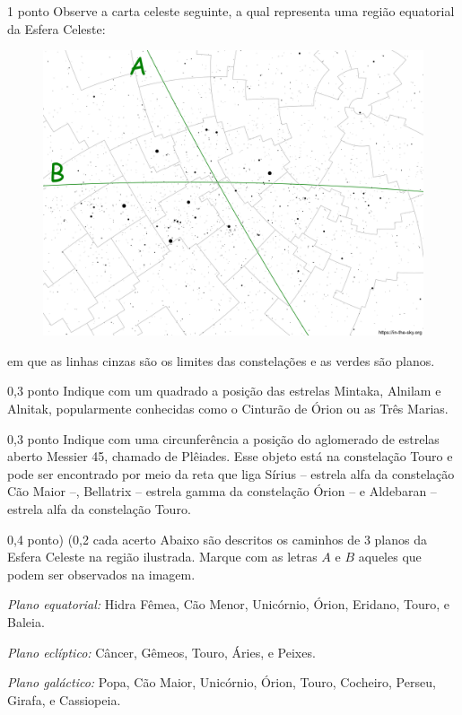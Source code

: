 \documentclass{../lista}
\begin{document}
	\begin{questao}{1 ponto}
		Observe a carta celeste seguinte, a qual representa uma região equatorial da Esfera Celeste:
		\begin{figure}[H]
			\centering
			\includegraphics[scale=0.5]{./img/4.png}
		\end{figure}
		em que as linhas cinzas são os limites das constelações e as verdes são planos.

		\begin{pergunta}{0,3 ponto}
			Indique com um quadrado a posição das estrelas Mintaka, Alnilam e Alnitak, popularmente conhecidas como o Cinturão de Órion ou as Três Marias.
		\end{pergunta}

		\begin{pergunta}{0,3 ponto}
			Indique com uma circunferência a posição do aglomerado de estrelas aberto Messier 45, chamado de Plêiades. Esse objeto está na constelação Touro e pode ser encontrado por meio da reta que liga Sírius -- estrela alfa da constelação Cão Maior --, Bellatrix -- estrela gamma da constelação Órion -- e Aldebaran -- estrela alfa da constelação Touro.
		\end{pergunta}

		\begin{pergunta}{0,4 ponto) (0,2 cada acerto}
			Abaixo são descritos os caminhos de 3 planos da Esfera Celeste na região ilustrada. Marque com as letras $A$ e $B$ aqueles que podem ser observados na imagem.
			\begin{alternativas}
				\item \textit{Plano equatorial:} Hidra Fêmea, Cão Menor, Unicórnio, Órion, Eridano, Touro, e Baleia.
				\item \textit{Plano eclíptico:} Câncer, Gêmeos, Touro, Áries, e Peixes.
				\item \textit{Plano galáctico:} Popa, Cão Maior, Unicórnio, Órion, Touro, Cocheiro, Perseu, Girafa, e Cassiopeia.
			\end{alternativas}
		\end{pergunta}
	\end{questao}
\end{document}
